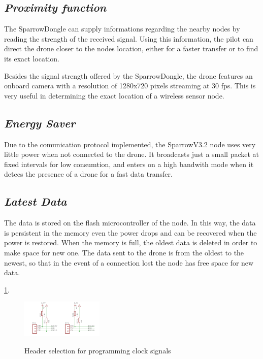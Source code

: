 \subsection{\textit{Proximity function}} 

\label{sec:prox}

The SparrowDongle can supply informations regarding the nearby nodes by reading the strength of the received signal. Using this information, the pilot can direct the drone closer to the nodes location, either for a faster transfer or to find its exact location. 

Besides the signal strength offered by the SparrowDongle, the drone features an onboard camera with a resolution of 1280x720 pixels streaming at 30 fps. This is very useful in determining the exact location of a wireless sensor node.


\subsection{\textit{Energy Saver}} 

\label{sec:eng}

Due to the comunication protocol implemented, the SparrowV3.2 node uses very little power when not connected to the drone. It broadcasts just a small packet at fixed intervals for low consumtion, and enters on a high bandwith mode when it detecs the presence of a drone for a fast data transfer. 


\subsection{\textit{Latest Data}} 

\label{sec:data}

The data is stored on the flash microcontroller of the node. In this way, the data is persistent in the memory even the power drops and can be recovered when the power is restored. When the memory is full, the oldest data is deleted in order to make space for new one. The data sent to the drone is from the oldest to the newest, so that in the event of a connection lost the node has free space for new data. 



\ref{fig:progr}.


\begin{figure}[ht] \centering \label{fig:progr}
\includegraphics[width=0.35\textwidth]{img/progr.png} \caption{Header selection
for programming clock signals} \end{figure}



